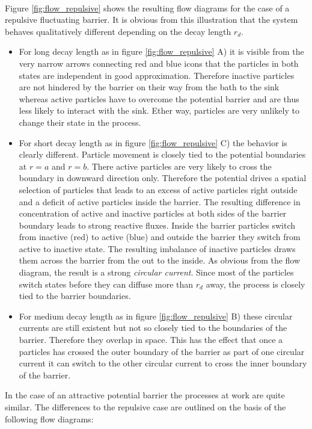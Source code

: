 \vspace{0.5 cm} \\
Figure \ref{fig:flow_repulsive} shows the resulting flow diagrams for the case of a repulsive fluctuating barrier. It is obvious from this illustration that the system behaves qualitatively different depending on the decay length $r_d$.
\begin{itemize}
    \item For long decay length as in figure \ref{fig:flow_repulsive} A) it is visible from the very narrow arrows connecting red and blue icons that the particles in both states are independent in good approximation. Therefore inactive particles are not hindered by the barrier on their way from the bath to the sink whereas active particles have to overcome the potential barrier and are thus less likely to interact with the sink. Ether way, particles are very unlikely to change their state in the process. 
    \item For short decay length as in figure \ref{fig:flow_repulsive} C) the behavior is clearly different. Particle movement is closely tied to the potential boundaries at $r=a$ and $r=b$. There active particles are very likely to cross the boundary in downward direction only. Therefore the potential drives a spatial selection of particles that leads to an excess of active particles right outside and a deficit of active particles inside the barrier. The resulting difference in concentration of active and inactive particles at both sides of the barrier boundary leads to strong reactive fluxes. Inside the barrier particles switch from inactive (red) to active (blue) and outside the barrier they switch from active to inactive state. The resulting imbalance of inactive particles draws them across the barrier from the out to the inside. As obvious from the flow diagram, the result is a strong \emph{circular current}. Since most of the particles switch states before they can diffuse more than $r_d$ away, the process is closely tied to the barrier boundaries. 
    \item For medium decay length as in figure \ref{fig:flow_repulsive} B) these circular currents are still existent but not so closely tied to the boundaries of the barrier. Therefore they overlap in space. This has the effect that once a particles has crossed the outer boundary of the barrier as part of one circular current it can switch to the other circular current to cross the inner boundary of the barrier. 
\end{itemize}
In the case of an attractive potential barrier the processes at work are quite similar. The differences to the repulsive case are outlined on the basis of the following flow diagrams: \vspace{-.5 cm} \\

